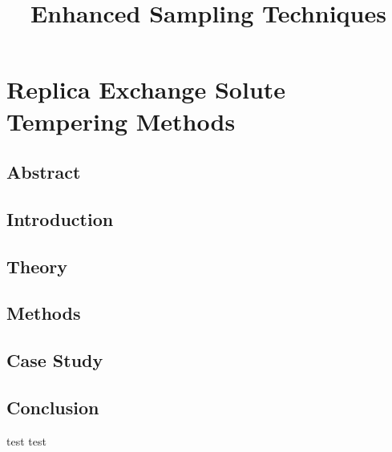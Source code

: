 \documentclass{memoir}
\title{Enhanced Sampling Techniques}
\begin{document}
\date{}

\maketitle

\tableofcontents

\chapter{Replica Exchange Solute Tempering Methods}

\section{Abstract}


\section{Introduction}

  
\section{Theory} 



\section{Methods}



\section{Case Study}

%

\section{Conclusion}

test
test



\end{document}
